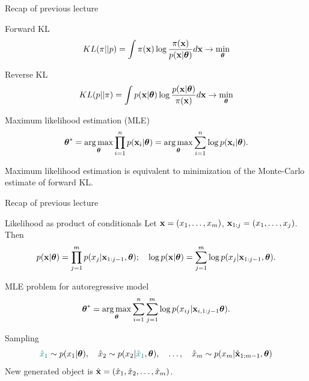 \begin{frame}{Recap of previous lecture}
	\begin{block}{Forward KL}
		\vspace{-0.2cm}
		\[
		KL(\pi || p) = \int \pi (\mathbf{x}) \log \frac{\pi(\mathbf{x})}{p(\mathbf{x} | \boldsymbol{\theta})} d \mathbf{x} \rightarrow \min_{\boldsymbol{\theta}}
		\]
	\end{block}
	\begin{block}{Reverse KL}
		\vspace{-0.2cm}
		\[
		KL(p || \pi) = \int p (\mathbf{x}| \boldsymbol{\theta}) \log \frac{p(\mathbf{x}| \boldsymbol{\theta})}{\pi(\mathbf{x})} d \mathbf{x} \rightarrow \min_{\boldsymbol{\theta}}
		\]
	\end{block}
	
	\begin{block}{Maximum likelihood estimation (MLE)}
		\vspace{-0.3cm}
		\[
		\boldsymbol{\theta}^* = \operatorname*{arg\,max}_{\boldsymbol{\theta}} \prod_{i=1}^n p(\mathbf{x}_i | \boldsymbol{\theta}) = \operatorname*{arg\,max}_{\boldsymbol{\theta}} \sum_{i=1}^n \log p(\mathbf{x}_i | \boldsymbol{\theta}).
		\]
		\vspace{-0.1cm}
	\end{block}
	Maximum likelihood estimation is equivalent to minimization of the Monte-Carlo estimate of forward KL.
\end{frame}
\begin{frame}{Recap of previous lecture}
	\begin{block}{Likelihood as product of conditionals}
		Let $\mathbf{x} = (x_1, \dots, x_m)$, $\mathbf{x}_{1:j} = (x_1, \dots, x_j)$. Then 
		\[
		p(\mathbf{x} | \boldsymbol{\theta}) = \prod_{j=1}^m p(x_j | \mathbf{x}_{1:j - 1}, \boldsymbol{\theta}); \quad 
		\log p(\mathbf{x} | \boldsymbol{\theta}) = \sum_{j=1}^m \log p(x_j | \mathbf{x}_{1:j - 1}, \boldsymbol{\theta}).
		\]
	\end{block}
	\vspace{-0.3cm}
	\begin{block}{MLE problem for autoregressive model}
		\vspace{-0.3cm}
		\[
		\boldsymbol{\theta}^* = \operatorname*{arg\,max}_{\boldsymbol{\theta}} \sum_{i=1}^n \sum_{j=1}^m \log p(x_{ij} | \mathbf{x}_{i, 1:j - 1}\boldsymbol{\theta}).
		\]
		\vspace{-0.5cm}
	\end{block}
	\begin{block}{Sampling}
		\vspace{-0.5cm}
		\[
		{\color{teal}\hat{x}_1} \sim p(x_1 | \boldsymbol{\theta}), \quad \hat{x}_2 \sim p(x_2 | {\color{teal}\hat{x}_1}, \boldsymbol{\theta}), \quad \dots, \quad \hat{x}_m \sim p(x_m | \hat{\mathbf{x}}_{1:m-1}, \boldsymbol{\theta})
		\]
		New generated object is $\hat{\mathbf{x}} = (\hat{x}_1, \hat{x}_2, \dots, \hat{x}_m)$.
	\end{block}
\end{frame}
